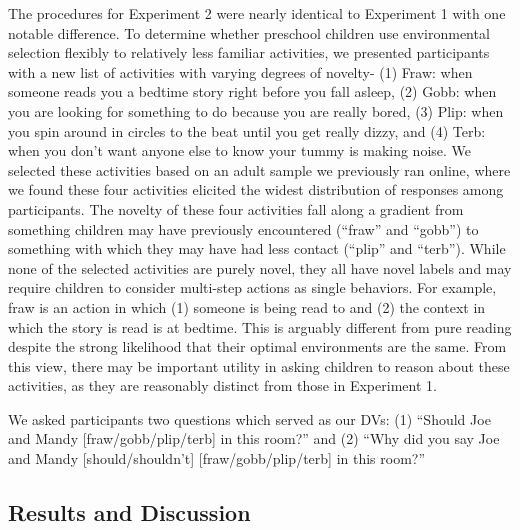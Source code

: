 \documentclass[10pt, letterpaper]{article}
\begin{document}
The procedures for Experiment 2 were nearly identical to Experiment 1
with one notable difference. To determine whether preschool children use
environmental selection flexibly to relatively less familiar activities,
we presented participants with a new list of activities with varying
degrees of novelty- (1) Fraw: when someone reads you a bedtime story
right before you fall asleep, (2) Gobb: when you are looking for
something to do because you are really bored, (3) Plip: when you spin
around in circles to the beat until you get really dizzy, and (4) Terb:
when you don't want anyone else to know your tummy is making noise. We
selected these activities based on an adult sample we previously ran
online, where we found these four activities elicited the widest
distribution of responses among participants. The novelty of these four
activities fall along a gradient from something children may have
previously encountered (``fraw'' and ``gobb'') to something with which
they may have had less contact (``plip'' and ``terb''). While none of
the selected activities are purely novel, they all have novel labels and
may require children to consider multi-step actions as single behaviors.
For example, fraw is an action in which (1) someone is being read to and
(2) the context in which the story is read is at bedtime. This is
arguably different from pure reading despite the strong likelihood that
their optimal environments are the same. From this view, there may be
important utility in asking children to reason about these activities,
as they are reasonably distinct from those in Experiment 1.

We asked participants two questions which served as our DVs: (1)
``Should Joe and Mandy {[}fraw/gobb/plip/terb{]} in this room?'' and (2)
``Why did you say Joe and Mandy {[}should/shouldn't{]}
{[}fraw/gobb/plip/terb{]} in this room?''

\hypertarget{results-and-discussion-1}{%
\subsection{Results and Discussion}\label{results-and-discussion-1}}
\end{document}
